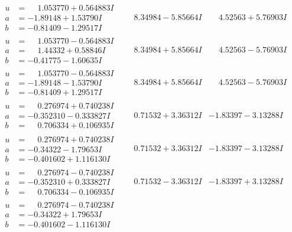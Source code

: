 \documentclass[1p]{elsarticle_modified}
\theoremstyle{definition}
\begin{document}
$$\begin{array}{c|c|c}
\begin{aligned}
u &= \phantom{-}1.053770 + 0.564883 I \\
a &= -1.89148 + 1.53790 I \\
b &= -0.81409 - 1.29517 I\end{aligned}
 & \phantom{-}8.34984 - 5.85664 I & \phantom{-}4.52563 + 5.76903 I \\ \hline\begin{aligned}
u &= \phantom{-}1.053770 - 0.564883 I \\
a &= \phantom{-}1.44332 + 0.58846 I \\
b &= -0.41775 - 1.60635 I\end{aligned}
 & \phantom{-}8.34984 + 5.85664 I & \phantom{-}4.52563 - 5.76903 I \\ \hline\begin{aligned}
u &= \phantom{-}1.053770 - 0.564883 I \\
a &= -1.89148 - 1.53790 I \\
b &= -0.81409 + 1.29517 I\end{aligned}
 & \phantom{-}8.34984 + 5.85664 I & \phantom{-}4.52563 - 5.76903 I \\ \hline\begin{aligned}
u &= \phantom{-}0.276974 + 0.740238 I \\
a &= -0.352310 - 0.333827 I \\
b &= \phantom{-}0.706334 + 0.106935 I\end{aligned}
 & \phantom{-}0.71532 + 3.36312 I & -1.83397 - 3.13288 I \\ \hline\begin{aligned}
u &= \phantom{-}0.276974 + 0.740238 I \\
a &= -0.34322 - 1.79653 I \\
b &= -0.401602 + 1.116130 I\end{aligned}
 & \phantom{-}0.71532 + 3.36312 I & -1.83397 - 3.13288 I \\ \hline\begin{aligned}
u &= \phantom{-}0.276974 - 0.740238 I \\
a &= -0.352310 + 0.333827 I \\
b &= \phantom{-}0.706334 - 0.106935 I\end{aligned}
 & \phantom{-}0.71532 - 3.36312 I & -1.83397 + 3.13288 I \\ \hline\begin{aligned}
u &= \phantom{-}0.276974 - 0.740238 I \\
a &= -0.34322 + 1.79653 I \\
b &= -0.401602 - 1.116130 I\end{aligned}

\end{array}$$
\end{document}
